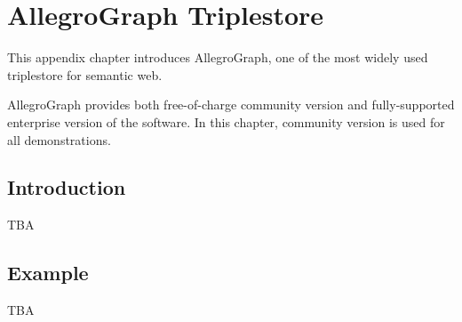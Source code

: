 \chapter{AllegroGraph Triplestore}

This appendix chapter introduces AllegroGraph, one of the most widely used triplestore for semantic web. 

AllegroGraph provides both free-of-charge community version and fully-supported enterprise version of the software. In this chapter, community version is used for all demonstrations.

\section{Introduction}

TBA

\section{Example}

TBA